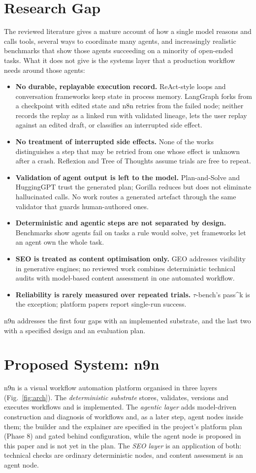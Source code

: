 \documentclass[conference]{IEEEtran}
\begin{document}
\section{Research Gap}
The reviewed literature gives a mature account of how a single model reasons and calls tools, several ways to coordinate many agents, and increasingly realistic benchmarks that show those agents succeeding on a minority of open-ended tasks. What it does not give is the systems layer that a production workflow needs around those agents:
\begin{itemize}
\item \textbf{No durable, replayable execution record.} ReAct-style loops and conversation frameworks keep state in process memory. LangGraph forks from a checkpoint with edited state and n8n retries from the failed node; neither records the replay as a linked run with validated lineage, lets the user replay against an edited draft, or classifies an interrupted side effect.
\item \textbf{No treatment of interrupted side effects.} None of the works distinguishes a step that may be retried from one whose effect is unknown after a crash. Reflexion and Tree of Thoughts assume trials are free to repeat.
\item \textbf{Validation of agent output is left to the model.} Plan-and-Solve and HuggingGPT trust the generated plan; Gorilla reduces but does not eliminate hallucinated calls. No work routes a generated artefact through the same validator that guards human-authored ones.
\item \textbf{Deterministic and agentic steps are not separated by design.} Benchmarks show agents fail on tasks a rule would solve, yet frameworks let an agent own the whole task.
\item \textbf{SEO is treated as content optimisation only.} GEO addresses visibility in generative engines; no reviewed work combines deterministic technical audits with model-based content assessment in one automated workflow.
\item \textbf{Reliability is rarely measured over repeated trials.} $\tau$-bench's pass\^{}k is the exception; platform papers report single-run success.
\end{itemize}
n9n addresses the first four gaps with an implemented substrate, and the last two with a specified design and an evaluation plan.

\section{Proposed System: n9n}
n9n is a visual workflow automation platform organised in three layers (Fig.~\ref{fig:arch}). The \emph{deterministic substrate} stores, validates, versions and executes workflows and is implemented. The \emph{agentic layer} adds model-driven construction and diagnosis of workflows and, as a later step, agent nodes inside them; the builder and the explainer are specified in the project's platform plan (Phase 8) and gated behind configuration, while the agent node is proposed in this paper and is not yet in the plan. The \emph{SEO layer} is an application of both: technical checks are ordinary deterministic nodes, and content assessment is an agent node.
\end{document}
